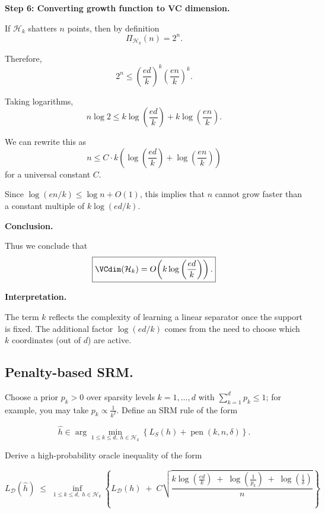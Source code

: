\documentclass[11pt]{article}
\newcommand{\calH}{\mathcal{H}}
\begin{document}
\begin{solutionbox}
\medskip

\textbf{Step 6: Converting growth function to VC dimension.}

If $\calH_k$ shatters $n$ points, then by definition
\[
\Pi_{\calH_k}(n) = 2^n.
\]

Therefore,
\[
2^n
\le
\left(\frac{ed}{k}\right)^k
\left(\frac{en}{k}\right)^k.
\]

Taking logarithms,
\[
n \log 2
\le
k \log\left(\frac{ed}{k}\right)
+
k \log\left(\frac{en}{k}\right).
\]

We can rewrite this as
\[
n
\le
C \cdot k \left(
\log\left(\frac{ed}{k}\right)
+
\log\left(\frac{en}{k}\right)
\right)
\]
for a universal constant $C$.

Since $\log(en/k) \le \log n + O(1)$, this implies that $n$ cannot grow faster than a constant multiple of $k \log(ed/k)$.

\medskip

\textbf{Conclusion.}

Thus we conclude that
\[
\boxed{
\VCdim(\calH_k)
=
O\!\left(k \log\left(\frac{ed}{k}\right)\right).
}
\]

\medskip

\textbf{Interpretation.}

The term $k$ reflects the complexity of learning a linear separator once the support is fixed. The additional factor $\log(ed/k)$ comes from the need to choose which $k$ coordinates (out of $d$) are active.

\end{solutionbox}


\subsection{Penalty-based SRM.}
Choose a prior $p_k > 0$ over sparsity levels $k = 1,\dots,d$ with 
$\sum_{k=1}^d p_k \le 1$; for example, you may take $p_k \propto \frac{1}{k^2}$.
Define an SRM rule of the form


\[
\hat{h} \in 
\arg\min_{1 \le k \le d,\; h \in \mathcal{H}_k}
\left\{
L_S(h) + \operatorname{pen}(k,n,\delta)
\right\}.
\]



Derive a high-probability oracle inequality of the form


\[
L_{\mathcal{D}}(\hat{h})
\;\le\;
\inf_{1 \le k \le d,\; h \in \mathcal{H}_k}
\left\{
L_{\mathcal{D}}(h)
\;+\;
C \sqrt{
\frac{
k \log\!\left(\frac{e d}{k}\right)
\;+\;
\log\!\left(\frac{1}{p_k}\right)
\;+\;
\log\!\left(\frac{1}{\delta}\right)
}{
n}
}
\right\}
\]
\end{document}
